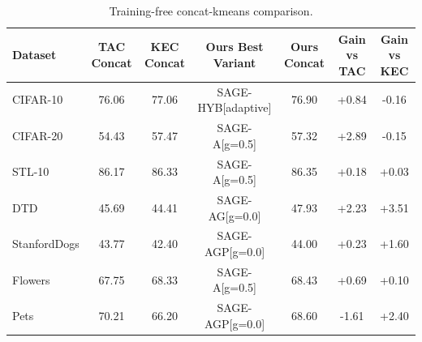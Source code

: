 \begin{table}[t]
\centering
\caption{Training-free concat-kmeans comparison.}
\label{tab:main_concat}
\begin{tabular}{lcccccc}
\toprule
Dataset & TAC Concat & KEC Concat & Ours Best Variant & Ours Concat & Gain vs TAC & Gain vs KEC \\
\midrule
CIFAR-10 & 76.06 & 77.06 & SAGE-HYB[adaptive] & 76.90 & +0.84 & -0.16 \\
CIFAR-20 & 54.43 & 57.47 & SAGE-A[g=0.5] & 57.32 & +2.89 & -0.15 \\
STL-10 & 86.17 & 86.33 & SAGE-A[g=0.5] & 86.35 & +0.18 & +0.03 \\
DTD & 45.69 & 44.41 & SAGE-AG[g=0.0] & 47.93 & +2.23 & +3.51 \\
StanfordDogs & 43.77 & 42.40 & SAGE-AGP[g=0.0] & 44.00 & +0.23 & +1.60 \\
Flowers & 67.75 & 68.33 & SAGE-A[g=0.5] & 68.43 & +0.69 & +0.10 \\
Pets & 70.21 & 66.20 & SAGE-AGP[g=0.0] & 68.60 & -1.61 & +2.40 \\
\bottomrule
\end{tabular}
\end{table}